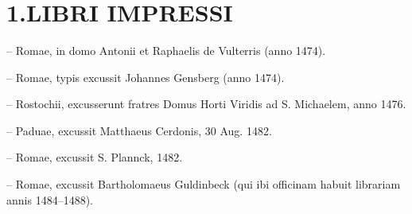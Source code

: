 \documentclass[a5paper,twoside]{article}
\renewcommand\Large{\fontsize{12.5}{13} \selectfont}
\begin{document}


\frenchspacing

\fontsize{11}{13.2}
\selectfont

\linespread{1.1}

\setlength{\parindent}{7mm}

\setcounter{page}{169}

\title{\Large{\MakeUppercase{Fontes lectionvm}}}

\date{}%

\maketitle 

\thispagestyle{empty}


\section*{1.\thinspace LIBRI IMPRESSI}
\begin{description}[nolistsep,itemsep=3pt,font=\rmfamily]
\item[V\hphantom{e}] -- Romae, in domo Antonii et Raphaelis de Vulterris (anno 1474).
\item[Ge] -- Romae, typis excussit Johannes Gensberg (anno 1474).
\item[R\hphantom{o}] -- Rostochii, excusserunt fratres Domus Horti Viridis ad S. Michaelem, anno 1476.
\item[C\hphantom{d}] -- Paduae, excussit Matthaeus Cerdonis, 30 Aug. 1482.
\item[P\hphantom{d}] -- Romae, excussit S. Plannck, 1482.
\item[Gd] -- Romae, excussit Bartholomaeus Guldinbeck (qui ibi officinam habuit librariam annis 1484–1488).
\end{description}
\end{document}
